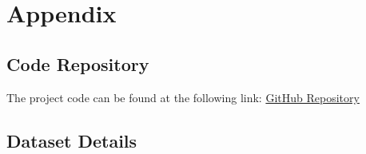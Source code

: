 \section*{Appendix}
\label{app:appendix}

\subsection*{Code Repository}

The project code can be found at the following link: \href{https://github.com/vbhaga89/MIT805_Project}{GitHub Repository}

\subsection*{Dataset Details}


